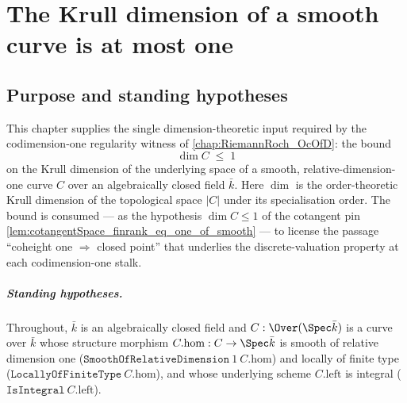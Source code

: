 
\chapter{The Krull dimension of a smooth curve is at most one}
\label{chap:RiemannRoch_CurveKrullDim}

\providecommand{\krullDim}{\dim}
\providecommand{\coheight}{\operatorname{coheight}}
\providecommand{\height}{\operatorname{height}}
\providecommand{\trdeg}{\operatorname{trdeg}}
\providecommand{\Frac}{\operatorname{Frac}}


\section{Purpose and standing hypotheses}

This chapter supplies the single dimension-theoretic input required by the
codimension-one regularity witness of \cref{chap:RiemannRoch_OcOfD}: the bound
\[
  \krullDim C \;\le\; 1
\]
on the Krull dimension of the underlying space of a smooth, relative-dimension-one
curve \(C\) over an algebraically closed field \(\bar k\).  Here \(\krullDim\) is the
order-theoretic Krull dimension of the topological space \(\lvert C\rvert\) under its
specialisation order.  The bound is consumed --- as the hypothesis \(\krullDim C \le
1\) of the cotangent pin
\cref{lem:cotangentSpace_finrank_eq_one_of_smooth} --- to license the passage
``coheight one \(\Rightarrow\) closed point'' that underlies the discrete-valuation
property at each codimension-one stalk.

\paragraph{Standing hypotheses.}  Throughout, \(\bar k\) is an algebraically closed
field and \(C : \Over(\Spec \bar k)\) is a curve over \(\bar k\) whose structure
morphism \(C.\mathrm{hom} : C \to \Spec \bar k\) is smooth of relative dimension one
(\(\texttt{SmoothOfRelativeDimension}\ 1\ C.\mathrm{hom}\)) and locally of finite type
(\(\texttt{LocallyOfFiniteType}\ C.\mathrm{hom}\)), and whose underlying scheme
\(C.\mathrm{left}\) is integral (\(\texttt{IsIntegral}\ C.\mathrm{left}\)).

